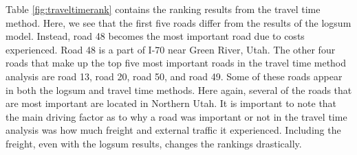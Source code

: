 \documentclass[3p, authoryear]{elsarticle} %
\begin{document}
Table \ref{fig:traveltimerank} contains the ranking results from the travel
time method. Here, we see that the first five roads differ from the results of
the logsum model. Instead, road 48 becomes the most important road due to costs
experienced. Road 48 is a part of I-70 near Green River, Utah. The other four
roads that make up the top five most important roads in the travel time method
analysis are road 13, road 20, road 50, and road 49. Some of these roads appear
in both the logsum and travel time methods. Here again, several of the roads
that are most important are located in Northern Utah. It is important to note
that the main driving factor as to why a road was important or not in the travel
time analysis was how much freight and external traffic it experienced.
Including the freight, even with the logsum results, changes the rankings
drastically.
\end{document}
